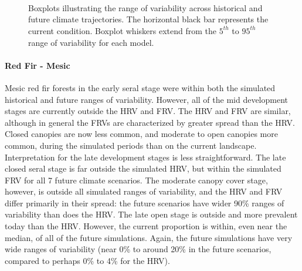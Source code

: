 \begin{figure}[htbp]
  \centering
  \qquad
   \\
  \qquad
   \\
       \\
  \qquad
    \qquad
    \caption{Boxplots illustrating the range of variability across historical and future climate trajectories. The horizontal black bar represents the current condition. Boxplot whiskers extend from the $5^{th}$ to $95^{th}$ range of variability for each model. }
  \label{fig:covcond_ocfw}
\end{figure} %

\paragraph{Red Fir - Mesic} Mesic red fir forests in the early seral stage were within both the simulated historical and future ranges of variability. However, all of the mid development stages are currently outside the HRV and FRV. The HRV and FRV are similar, although in general the FRVs are characterized by greater spread than the HRV. Closed canopies are now less common, and moderate to open canopies more common, during the simulated periods than on the current landscape. Interpretation for the late development stages is less straightforward. The late closed seral stage is far outside the simulated HRV, but within the simulated FRV for all 7 future climate scenarios. The moderate canopy cover stage, however, is outside all simulated ranges of variability, and the HRV and FRV differ primarily in their spread: the future scenarios have wider 90\% ranges of variability than does the HRV. The late open stage is outside and more prevalent today than the HRV. However, the current proportion is within, even near the median, of all of the future simulations. Again, the future simulations have very wide ranges of variability (near 0\% to around 20\% in the future scenarios, compared to perhaps 0\% to 4\% for the HRV). 

